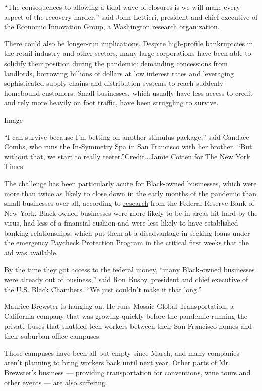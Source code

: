 ``The consequences to allowing a tidal wave of closures is we will make
every aspect of the recovery harder,'' said John Lettieri, president and
chief executive of the Economic Innovation Group, a Washington research
organization.

There could also be longer-run implications. Despite high-profile
bankruptcies in the retail industry and other sectors, many large
corporations have been able to solidify their position during the
pandemic: demanding concessions from landlords, borrowing billions of
dollars at low interest rates and leveraging sophisticated supply chains
and distribution systems to reach suddenly homebound customers. Small
businesses, which usually have less access to credit and rely more
heavily on foot traffic, have been struggling to survive.

Image

``I can survive because I'm betting on another stimulus package,'' said
Candace Combs, who runs the In-Symmetry Spa in San Francisco with her
brother. ``But without that, we start to really teeter.''Credit...Jamie
Cotten for The New York Times

The challenge has been particularly acute for Black-owned businesses,
which were more than twice as likely to close down in the early months
of the pandemic than small businesses over all, according to
\href{https://www.newyorkfed.org/medialibrary/media/smallbusiness/DoubleJeopardy_COVID19andBlackOwnedBusinesses}{research}
from the Federal Reserve Bank of New York. Black-owned businesses were
more likely to be in areas hit hard by the virus, had less of a
financial cushion and were less likely to have established banking
relationships, which put them at a disadvantage in seeking loans under
the emergency Paycheck Protection Program in the critical first weeks
that the aid was available.

By the time they got access to the federal money, ``many Black-owned
businesses were already out of business,'' said Ron Busby, president and
chief executive of the U.S. Black Chambers. ``We just couldn't make it
that long.''

Maurice Brewster is hanging on. He runs Mosaic Global Transportation, a
California company that was growing quickly before the pandemic running
the private buses that shuttled tech workers between their San Francisco
homes and their suburban office campuses.

Those campuses have been all but empty since March, and many companies
aren't planning to bring workers back until next year. Other parts of
Mr. Brewster's business --- providing transportation for conventions,
wine tours and other events --- are also suffering.

